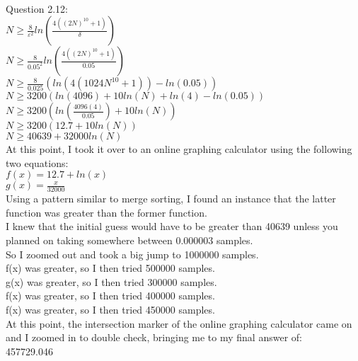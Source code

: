 \documentclass[a4paper]{article}
\begin{document}
\\
Question 2.12:\\
$N\geq\frac{8}{\varepsilon^2}ln(\frac{4((2N)^{10}+1)}{\delta})$\\
$N\geq\frac{8}{0.05^2}ln(\frac{4((2N)^{10}+1)}{0.05})$\\
$N\geq\frac{8}{0.025}(ln(4(1024N^{10}+1))-ln(0.05))$\\
$N\geq3200(ln(4096)+10ln(N)+ln(4)-ln(0.05))$\\
$N\geq3200(ln(\frac{4096(4)}{0.05})+10ln(N))$\\
\newpage
$N\geq3200(12.7+10ln(N))$\\
$N\geq40639+32000ln(N)$\\
At this point, I took it over to an online graphing calculator using the following two equations:\\
$f(x)=12.7+ln(x)$\\
$g(x)=\frac{x}{32000}$\\
Using a pattern similar to merge sorting, I found an instance that the latter function was greater than the former function.\\
I knew that the initial guess would have to be greater than 40639 unless you planned on taking somewhere between 0.000003 samples.\\
So I zoomed out and took a big jump to 1000000 samples.\\
f(x) was greater, so I then tried 500000 samples.\\
g(x) was greater, so I then tried 300000 samples.\\
f(x) was greater, so I then tried 400000 samples.\\
f(x) was greater, so I then tried 450000 samples.\\
At this point, the intersection marker of the online graphing calculator came on and I zoomed in to double check, bringing me to my final answer of:\\
457729.046\\
\end{document}
